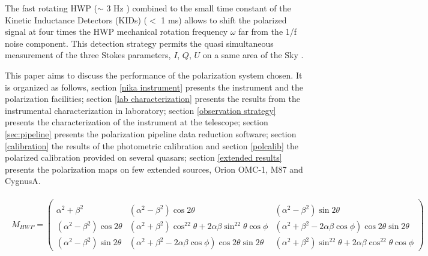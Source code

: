 \documentclass[twocolumn,traditabstract]{aa}
\begin{document}
The fast rotating HWP ($\sim$ 3 Hz ) combined to the small time constant of the Kinetic Inductance Detectors (KIDs) ($ < $ 1 ms) allows to shift the polarized signal at four times the HWP mechanical rotation frequency $\omega$ far from the 1/f noise component. This detection strategy permits the quasi simultaneous measurement of the three Stokes parameters, $I$, $Q$, $U$ on a same area of the Sky \citep{johnson2007}. 

This paper aims to discuss the performance of the polarization system chosen. It
is organized as follows, section \ref{nika instrument} presents the instrument
and the polarization facilities; section \ref{lab characterization} presents the
results from the instrumental characterization in laboratory; section
\ref{observation strategy} presents the characterization of the instrument at
the telescope; section \ref{sec:pipeline} presents the polarization pipeline
data reduction software; section \ref{calibration} the results of the
photometric calibration and section \ref{polcalib} the polarized calibration
provided on several quasars; section \ref{extended results} presents the
polarization maps on few extended sources, Orion OMC-1, M87 and CygnusA.


\begin{strip}
  \begin{eqnarray} \label{equ.HWP}
    \begin{split}
      M_{HWP}=\left(\begin{array}{lll} \\
        \alpha^2+\beta^2              & (\alpha^2-\beta^2)\cos2\theta & (\alpha^2-\beta^2)\sin2\theta \\
        (\alpha^2-\beta^2)\cos2\theta & (\alpha^2+\beta^2)\cos^22\theta +
        2\alpha\beta\sin^22\theta\cos\phi &
        (\alpha^2+\beta^2-2\alpha\beta\cos\phi)\cos2\theta\sin2\theta \\
        (\alpha^2-\beta^2)\sin2\theta &
        (\alpha^2+\beta^2-2\alpha\beta\cos\phi)\cos2\theta\sin2\theta &
        (\alpha^2+\beta^2)\sin^22\theta + 2\alpha\beta\cos^22\theta\cos\phi
      \end{array}\right)
    \end{split}
  \end{eqnarray}
\end{strip}
\end{document}
